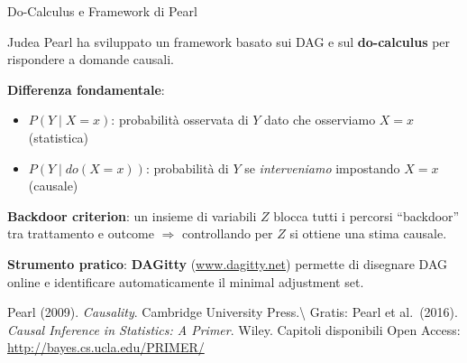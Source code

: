 \documentclass[
  ignorenonframetext,
]{beamer}
\begin{document}
\begin{frame}{Do-Calculus e Framework di Pearl}
\label{do-calculus-e-framework-di-pearl}
\small

Judea Pearl ha sviluppato un framework basato sui DAG e sul
\textbf{do-calculus} per rispondere a domande causali.

\vspace{0.3em}

\textbf{Differenza fondamentale}:

\begin{itemize}\footnotesize
\item $P(Y \mid X=x)$: probabilità osservata di $Y$ dato che osserviamo $X=x$ (statistica)
\item $P(Y \mid do(X=x))$: probabilità di $Y$ se \emph{interveniamo} impostando $X=x$ (causale)
\end{itemize}

\vspace{0.3em}

\textbf{Backdoor criterion}: un insieme di variabili \(Z\) blocca tutti
i percorsi ``backdoor'' tra trattamento e outcome \(\Rightarrow\)
controllando per \(Z\) si ottiene una stima causale.

\vspace{0.3em}

\textbf{Strumento pratico}: \textbf{DAGitty} (\url{www.dagitty.net})
permette di disegnare DAG online e identificare automaticamente il
minimal adjustment set.

\vspace{0.2em}

\tiny Pearl (2009). \emph{Causality}. Cambridge University
Press.\textbackslash{} Gratis: Pearl et al.~(2016).
\emph{Causal Inference in Statistics: A Primer}. Wiley. Capitoli
disponibili Open Access: \url{http://bayes.cs.ucla.edu/PRIMER/}
\end{frame}
\end{document}
